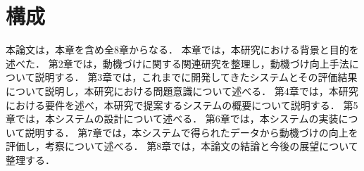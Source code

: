 \section{構成}
本論文は，本章を含め全8章からなる．
本章では，本研究における背景と目的を述べた．
第2章では，動機づけに関する関連研究を整理し，動機づけ向上手法について説明する．
第3章では，これまでに開発してきたシステムとその評価結果について説明し，本研究における問題意識について述べる．
第4章では，本研究における要件を述べ，本研究で提案するシステムの概要について説明する．
第5章では，本システムの設計について述べる．
第6章では，本システムの実装について説明する．
第7章では，本システムで得られたデータから動機づけの向上を評価し，考察について述べる．
第8章では，本論文の結論と今後の展望について整理する．